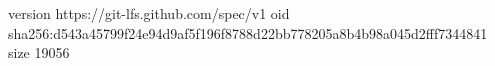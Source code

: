 version https://git-lfs.github.com/spec/v1
oid sha256:d543a45799f24e94d9af5f196f8788d22bb778205a8b4b98a045d2fff7344841
size 19056
